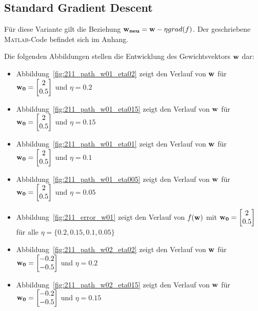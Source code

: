 \subsection{Standard Gradient Descent}

Für diese Variante gilt die Beziehung $ \mathbf{w_{neu}} = \mathbf{w} - \eta grad(f) $. Der geschriebene \textsc{Matlab}-Code befindet sich im Anhang.

Die folgenden Abbildungen stellen die Entwicklung des Gewichtsvektors $\mathbf{w}$ dar:

\begin{itemize}
  \item Abbildung~\ref{fig:211_path_w01_eta02} zeigt den Verlauf von $\mathbf{w}$ für $\mathbf{w_0} = \begin{bmatrix} 2 \\ 0.5 \end{bmatrix}$ und $\eta = 0.2$
  \item Abbildung~\ref{fig:211_path_w01_eta015} zeigt den Verlauf von $\mathbf{w}$ für $\mathbf{w_0} = \begin{bmatrix} 2 \\ 0.5 \end{bmatrix}$ und $\eta = 0.15$
  \item Abbildung~\ref{fig:211_path_w01_eta01} zeigt den Verlauf von $\mathbf{w}$ für $\mathbf{w_0} = \begin{bmatrix} 2 \\ 0.5 \end{bmatrix}$ und $\eta = 0.1$
  \item Abbildung~\ref{fig:211_path_w01_eta005} zeigt den Verlauf von $\mathbf{w}$ für $\mathbf{w_0} = \begin{bmatrix} 2 \\ 0.5 \end{bmatrix}$ und $\eta = 0.05$
  \item Abbildung~\ref{fig:211_error_w01} zeigt den Verlauf von $f(\mathbf{w})$ mit $\mathbf{w_0} = \begin{bmatrix} 2 \\ 0.5 \end{bmatrix}$ für alle $\eta = \{0.2, 0.15, 0.1, 0.05\}$
  \item Abbildung~\ref{fig:211_path_w02_eta02} zeigt den Verlauf von $\mathbf{w}$ für $\mathbf{w_0} = \begin{bmatrix} -0.2 \\ -0.5 \end{bmatrix}$ und $\eta = 0.2$
  \item Abbildung~\ref{fig:211_path_w02_eta015} zeigt den Verlauf von $\mathbf{w}$ für $\mathbf{w_0} = \begin{bmatrix} -0.2 \\ -0.5 \end{bmatrix}$ und $\eta = 0.15$

\end{itemize}
